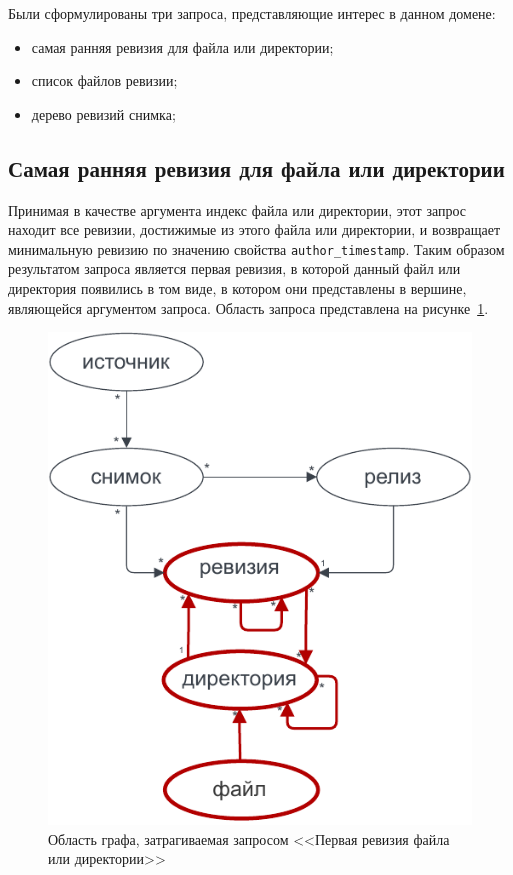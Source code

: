 \documentclass[times,specification,annotation]{itmo-student-thesis}
\begin{document}
Были сформулированы три запроса, представляющие интерес в данном домене:

\begin{itemize}
    \item самая ранняя ревизия для файла или директории;
    \item список файлов ревизии;
    \item дерево ревизий снимка;
\end{itemize}

\subsection{Самая ранняя ревизия для файла или директории}

Принимая в качестве аргумента индекс файла или директории, этот запрос находит все ревизии, достижимые из этого файла или директории, и возвращает минимальную ревизию по значению свойства \texttt{author\_timestamp}. Таким образом результатом запроса является первая ревизия, в которой данный файл или директория появились в том виде, в котором они представлены в вершине, являющейся аргументом запроса. Область запроса представлена на рисунке~\ref{ecr-graph}.

\begin{figure}[!h]
\caption{Область графа, затрагиваемая запросом <<Первая ревизия файла или директории>>}\label{ecr-graph}
\centering
\includegraphics{img/ecr-graph.pdf}
\end{figure}
\end{document}
